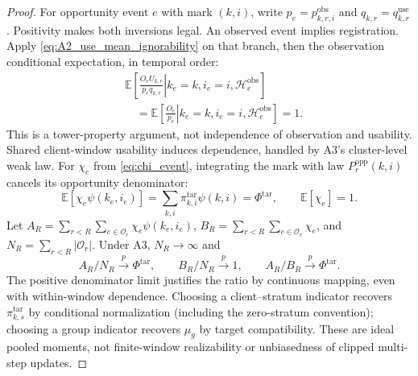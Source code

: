 \begin{proof}
For opportunity event $e$ with mark $(k,i)$, write $p_e=p^{\mathrm{obs}}_{k,r,i}$
and $q_{k,r}=q^{\mathrm{use}}_{k,r}$.  Positivity makes both inversions legal.
An observed event implies registration.  Apply
\eqref{eq:A2_use_mean_ignorability} on that branch, then the observation
conditional expectation, in temporal order:
\begin{align}
&\mathbb E\!\left[\left.\frac{O_eU_{k,r}}{p_eq_{k,r}}
\right|k_e=k,i_e=i,\mathcal H_e^{\mathrm{obs}}\right]\nonumber\\
&\quad=\mathbb E\!\left[\left.\frac{O_e}{p_e}
\right|k_e=k,i_e=i,\mathcal H_e^{\mathrm{obs}}\right]=1.
\label{eq:app_sequential_identity}
\end{align}
This is a tower-property argument, not independence of observation and
usability.  Shared client-window usability induces dependence, handled by A3's
cluster-level weak law.
For $\chi_e$ from \eqref{eq:chi_event}, integrating the mark with law
$P_r^{\mathrm{opp}}(k,i)$ cancels its opportunity denominator:
\begin{equation}
\mathbb E[\chi_e\psi(k_e,i_e)]
=\sum_{k,i}\pi^{\mathrm{tar}}_{k,i}\psi(k,i)=\Phi^{\mathrm{tar}},
\qquad \mathbb E[\chi_e]=1.
\label{eq:app_expected_numerator_event}
\end{equation}
Let $A_R=\sum_{r<R}\sum_{e\in\mathcal O_r}\chi_e\psi(k_e,i_e)$,
$B_R=\sum_{r<R}\sum_{e\in\mathcal O_r}\chi_e$, and
$N_R=\sum_{r<R}|\mathcal O_r|$.  Under A3, $N_R\to\infty$ and
\begin{equation}
A_R/N_R\xrightarrow{p}\Phi^{\mathrm{tar}},\qquad
B_R/N_R\xrightarrow{p}1,\qquad A_R/B_R\xrightarrow{p}\Phi^{\mathrm{tar}}.
\label{eq:app_hajek_limit}
\end{equation}
The positive denominator limit justifies the ratio by continuous mapping,
even with within-window dependence.  Choosing a client--stratum indicator
recovers $\pi^{\mathrm{tar}}_{k,s}$ by conditional normalization (including
the zero-stratum convention); choosing a group indicator recovers $\mu_g$
by target compatibility.  These are ideal pooled moments, not finite-window
realizability or unbiasedness of clipped multi-step updates.
\end{proof}

